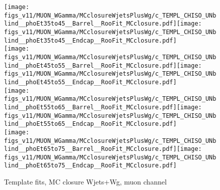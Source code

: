 \begin{figure}[htb]
  \begin{center}
   \texttt{[image: figs\_v11/MUON\_WGamma/MCclosureWjetsPlusWg/c\_TEMPL\_CHISO\_UNblind\_\_phoEt35to45\_\_Barrel\_\_RooFit\_MCclosure.pdf]}\texttt{[image: figs\_v11/MUON\_WGamma/MCclosureWjetsPlusWg/c\_TEMPL\_CHISO\_UNblind\_\_phoEt35to45\_\_Endcap\_\_RooFit\_MCclosure.pdf]}\\
   \texttt{[image: figs\_v11/MUON\_WGamma/MCclosureWjetsPlusWg/c\_TEMPL\_CHISO\_UNblind\_\_phoEt45to55\_\_Barrel\_\_RooFit\_MCclosure.pdf]}\texttt{[image: figs\_v11/MUON\_WGamma/MCclosureWjetsPlusWg/c\_TEMPL\_CHISO\_UNblind\_\_phoEt45to55\_\_Endcap\_\_RooFit\_MCclosure.pdf]}\\
   \texttt{[image: figs\_v11/MUON\_WGamma/MCclosureWjetsPlusWg/c\_TEMPL\_CHISO\_UNblind\_\_phoEt55to65\_\_Barrel\_\_RooFit\_MCclosure.pdf]}\texttt{[image: figs\_v11/MUON\_WGamma/MCclosureWjetsPlusWg/c\_TEMPL\_CHISO\_UNblind\_\_phoEt55to65\_\_Endcap\_\_RooFit\_MCclosure.pdf]}\\
   \texttt{[image: figs\_v11/MUON\_WGamma/MCclosureWjetsPlusWg/c\_TEMPL\_CHISO\_UNblind\_\_phoEt65to75\_\_Barrel\_\_RooFit\_MCclosure.pdf]}\texttt{[image: figs\_v11/MUON\_WGamma/MCclosureWjetsPlusWg/c\_TEMPL\_CHISO\_UNblind\_\_phoEt65to75\_\_Endcap\_\_RooFit\_MCclosure.pdf]}\\
  \label{fig:templateFits_MCclosureWjetsPlusWg_CHISO_MUON_2}
  \caption{Template fits, MC closure Wjets+Wg, muon channel}
  \end{center}
\end{figure}

